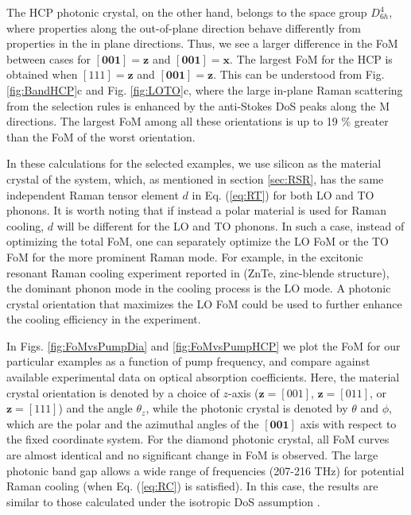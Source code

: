 \documentclass[%
 reprint,
superscriptaddress,
 amsmath,amssymb,
 aps,
pra,
]{revtex4-1}
\newcommand{\mb}[1]{\mathbf{#1}} %
\begin{document}
The HCP photonic crystal, on the other hand, belongs to the space group $D_{6h}^4$, where properties along the out-of-plane direction behave differently from properties in the in plane directions. Thus, we see a larger difference in the FoM between cases for $[\textbf{001}]=\mb{z}$ and $[\textbf{001}]=\mb{x}$. The largest FoM for the HCP is obtained when $[111]=\mb{z}$ and $[\textbf{001}]=\mb{z}$. This can be understood from Fig. \ref{fig:BandHCP}c and Fig. \ref{fig:LOTO}c, where the large in-plane Raman scattering from the selection rules is enhanced by the anti-Stokes DoS peaks along the M directions. The largest FoM among all these orientations is up to 19 \% greater than the FoM of the worst orientation. 







In these calculations for the selected examples, we use silicon as the material crystal of the system, which, as mentioned in section \ref{sec:RSR}, has the same independent Raman tensor element $d$ in Eq. (\ref{eq:RT}) for both LO and TO phonons. It is worth noting that if instead a polar material is used for Raman cooling, $d$ will be different for the LO and TO phonons. In such a case, instead of optimizing the total FoM, one can separately optimize the LO FoM or the TO FoM for the more prominent Raman mode. For example, in the excitonic resonant Raman cooling experiment reported in \cite{zhang2016resolved} (ZnTe, zinc-blende structure), the dominant phonon mode in the cooling process is the LO mode. A photonic crystal orientation that maximizes the LO FoM could be used to further enhance the cooling efficiency in the experiment.







\vspace{10pt}


In Figs. \ref{fig:FoMvsPumpDia} and \ref{fig:FoMvsPumpHCP} we plot the FoM for our particular examples as a function of pump frequency, and compare against available experimental data on optical absorption coefficients.  Here, the material crystal orientation is denoted by a choice of $z$-axis ($\mb{z}=[001]$, $\mb{z}=[011]$, or $\mb{z}=[111]$) and the angle  $\theta_z$, while the photonic crystal is denoted by $\theta$ and $\phi$, which are the polar and the azimuthal angles of the $[\textbf{001}]$ axis with respect to the fixed coordinate system. For the diamond photonic crystal, all FoM curves are almost identical and no significant change in FoM is observed. The large photonic band gap allows a wide range of frequencies (207-216 THz) for potential Raman cooling (when Eq. (\ref{eq:RC}) is satisfied). In this case, the results are similar to those calculated under the isotropic DoS assumption \cite{chen2015raman}.
\end{document}

